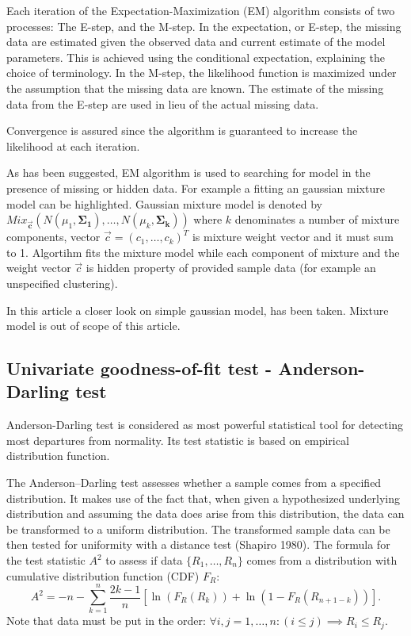 \documentclass[a4paper,journal]{IEEEtran}
\begin{document}
Each iteration of the Expectation-Maximization (EM) algorithm consists of two processes: 
The E-step, and the M-step. In the expectation, or E-step, the missing data are estimated given the observed 
data and current estimate of the model parameters. 
This is achieved using the conditional expectation, explaining the choice of terminology.
In the M-step, the likelihood function is maximized under the assumption that the missing data are known. 
The estimate of the missing data from the E-step are used in lieu of the actual missing data.

Convergence is assured since the algorithm is guaranteed to increase the likelihood at each iteration.

As has been suggested, EM algorithm is used to searching for model in the presence of missing or hidden data.
For example a fitting an gaussian mixture model can be highlighted. Gaussian mixture model is denoted by
$ Mix_{\mathbf{\vec{c}}}(N(\mu_1,\mathbf{\Sigma_1}),\ldots,N(\mu_k,\mathbf{\Sigma_k})) $ where $k$ denominates a number
of mixture components, vector $\vec{c} = (c_1,\ldots,c_k)^T$ is mixture weight vector and it must sum to 1.
Algortihm fits the mixture model while each component of mixture and the weight vector $\vec{c}$
is hidden property of provided sample data (for example an unspecified clustering).

In this article a closer look on simple gaussian model, has been taken. 
Mixture model is out of scope of this article.

\subsection{Univariate goodness-of-fit test - Anderson-Darling test}
Anderson-Darling test is considered as most powerful statistical tool for detecting most departures from normality. 
\cite{Ste74} Its test statistic is based on empirical distribution function.

The Anderson–Darling test assesses whether a sample comes from a specified distribution. It makes use of the fact that, 
when given a hypothesized underlying distribution and assuming the data does arise from this distribution, 
the data can be transformed to a uniform distribution. 
The transformed sample data can be then tested for uniformity with a distance test (Shapiro 1980).
The formula for the test statistic $A^2$ to assess if data $\{R_1,\ldots,R_n\}$ comes from a distribution with cumulative distribution function (CDF) $F_R$:
\begin{equation}
A^2=-n-\sum_{k=1}^n \frac{2k-1}{n}\left[\ln( F_R(R_k)) + \ln\left(1-F_R(R_{n+1-k})\right)\right].
\end{equation}
Note that data must be put in the order: $\forall i,j = 1,\ldots,n: (i \le j) \implies R_i \le R_j $.
\end{document}
